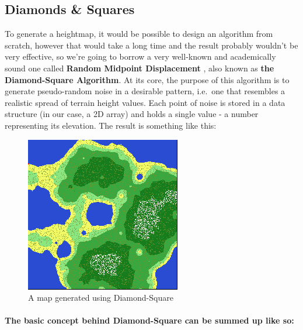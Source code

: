 \documentclass{article}
\begin{document}
	
\subsection{Diamonds \& Squares}


To generate a heightmap, it would be possible to design an algorithm from scratch, however that would take a long time and the result probably wouldn't be very effective, so we're going to borrow a very well-known and academically sound one called \textbf{Random Midpoint Displacement} \parencite{fournier}, also known as \textbf{the Diamond-Square Algorithm}. At its core, the purpose of this algorithm is to generate pseudo-random noise in a desirable pattern, i.e.~one that resembles a realistic spread of terrain height values. Each point of noise is stored in a data structure (in our case, a 2D array) and holds a single value - a number representing its elevation. The result is something like this:
	
\begin{figure}[H]
	\centering
	\includegraphics{map.jpg}
	\renewcommand{\figurename}{Example}
	\caption{A map generated using Diamond-Square}
\end{figure}

\paragraph{The basic concept behind Diamond-Square can be summed up like so:}
	
\end{document}
